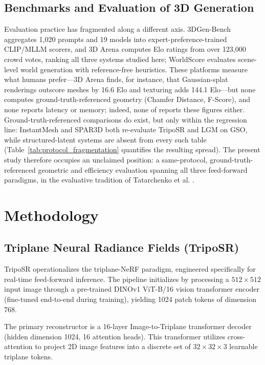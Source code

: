 \documentclass[10pt, conference]{IEEEtran}
\begin{document}
\subsection{Benchmarks and Evaluation of 3D Generation}
Evaluation practice has fragmented along a different axis. 3DGen-Bench \cite{threedgenbench2025} aggregates 1{,}020 prompts and 19 models into expert-preference-trained CLIP/MLLM scorers, and 3D Arena \cite{arenad2025} computes Elo ratings from over 123{,}000 crowd votes, ranking all three systems studied here; WorldScore \cite{worldscore2025} evaluates scene-level world generation with reference-free heuristics. These platforms measure what humans prefer---3D Arena finds, for instance, that Gaussian-splat renderings outscore meshes by 16.6 Elo and texturing adds 144.1 Elo---but none computes ground-truth-referenced geometry (Chamfer Distance, F-Score), and none reports latency or memory; indeed, none of \cite{triposg2025,hunyuan3d2_2025,sparc3d2025,lattice2025} reports these figures either. Ground-truth-referenced comparisons do exist, but only within the regression line: InstantMesh \cite{instantmesh2024} and SPAR3D \cite{spar3d2025} both re-evaluate TripoSR and LGM on GSO, while structured-latent systems are absent from every such table (Table~\ref{tab:protocol_fragmentation} quantifies the resulting spread). The present study therefore occupies an unclaimed position: a same-protocol, ground-truth-referenced geometric and efficiency evaluation spanning all three feed-forward paradigms, in the evaluative tradition of Tatarchenko et al. \cite{tatarchenko2019}.

\section{Methodology}

\subsection{Triplane Neural Radiance Fields (TripoSR)}
TripoSR \cite{triposr2024} operationalizes the triplane-NeRF paradigm, engineered specifically for real-time feed-forward inference. The pipeline initializes by processing a $512 \times 512$ input image through a pre-trained DINOv1 ViT-B/16 \cite{dinov1} vision transformer encoder (fine-tuned end-to-end during training), yielding 1024 patch tokens of dimension 768. 

The primary reconstructor is a 16-layer Image-to-Triplane transformer decoder (hidden dimension 1024, 16 attention heads). This transformer utilizes cross-attention to project 2D image features into a discrete set of $32 \times 32 \times 3$ learnable triplane tokens. 
\end{document}
